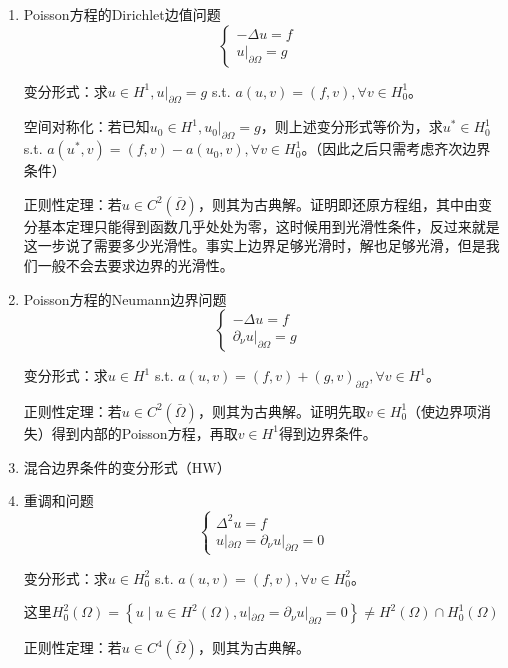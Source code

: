 \begin{enumerate}
  \item Poisson方程的Dirichlet边值问题
  \[
    \left\{\begin{array}{ll}
      -\Delta u=f & \\
      u|_{\partial \Omega}=g &
    \end{array}\right.
  \]
  
  变分形式：求$u \in H^1, u|_{\partial \Omega} = g$ s.t. $a(u, v) = (f, v), \forall v \in H_0^1$。
  
  空间对称化：若已知$u_0 \in H^1, u_0|_{\partial \Omega} = g$，则上述变分形式等价为，求$u^{\ast} \in H_0^1$ s.t. $a(u^{\ast}, v) = (f, v) - a(u_0, v), \forall v \in H_0^1$。（因此之后只需考虑齐次边界条件）
  
  正则性定理：若$u \in C^2(\bar{\Omega})$，则其为古典解。证明即还原方程组，其中由变分基本定理只能得到函数几乎处处为零，这时候用到光滑性条件，反过来就是这一步说了需要多少光滑性。事实上边界足够光滑时，解也足够光滑，但是我们一般不会去要求边界的光滑性。
  
  \item Poisson方程的Neumann边界问题
  \[
    \left\{\begin{array}{ll}
      -\Delta u=f & \\
      \partial_{\nu} u|_{\partial \Omega}=g &
    \end{array}\right.
  \]
  
  变分形式：求$u \in H^1$ s.t. $a(u, v) = (f, v) + (g, v)_{\partial \Omega}, \forall v \in H^1$。
  
  正则性定理：若$u \in C^2(\bar{\Omega})$，则其为古典解。证明先取$v \in H_0^1$（使边界项消失）得到内部的Poisson方程，再取$v \in H^1$得到边界条件。

  \item 混合边界条件的变分形式（HW）
  
  \item 重调和问题
  \[
    \left\{\begin{array}{l}
      \Delta^{2} u=f \\
      u|_{\partial \Omega}=\partial_{\nu} u|_{\partial \Omega}=0
    \end{array}\right.
  \]
  
  变分形式：求$u \in H_0^2$ s.t. $a(u, v) = (f, v), \forall v \in H_0^2$。

  这里$H_{0}^{2}(\Omega)=\left\{u \mid u \in H^{2}(\Omega), u|_{\partial \Omega}=\partial_\nu u|_{\partial \Omega}=0\right\} \neq H^2(\Omega) \cap H_0^1(\Omega)$
  
  正则性定理：若$u \in C^4(\bar{\Omega})$，则其为古典解。
\end{enumerate}

